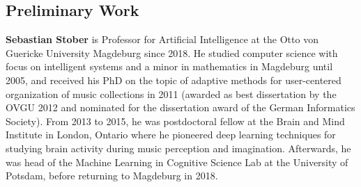 \documentclass[11pt]{article}
\begin{document}




\subsection*{Preliminary Work}
\label{sec:preliminary work}

\textbf{Sebastian Stober}
is Professor for Artificial Intelligence at the Otto von Guericke University Magdeburg since 2018. 
He studied computer science with focus on intelligent systems and a minor in mathematics in Magdeburg until 2005, and received his PhD on the topic of adaptive methods for user-centered organization of music collections in 2011 (awarded as best dissertation by the OVGU 2012 and nominated for the dissertation award of the German Informatics Society). 
From 2013 to 2015, he was postdoctoral fellow at the Brain and Mind Institute in London, Ontario where he pioneered deep learning techniques for studying brain activity during music perception and imagination. 
Afterwards, he was head of the Machine Learning in Cognitive Science Lab at the University of Potsdam, before returning to Magdeburg in 2018.
\end{document}
